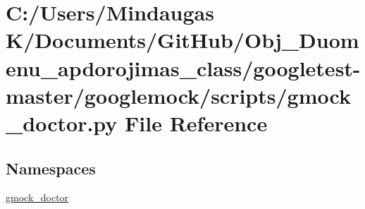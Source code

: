 \hypertarget{googletest-master_2googlemock_2scripts_2gmock__doctor_8py}{}\section{C\+:/\+Users/\+Mindaugas K/\+Documents/\+Git\+Hub/\+Obj\+\_\+\+Duomenu\+\_\+apdorojimas\+\_\+class/googletest-\/master/googlemock/scripts/gmock\+\_\+doctor.py File Reference}
\label{googletest-master_2googlemock_2scripts_2gmock__doctor_8py}
\subsection*{Namespaces}
\begin{DoxyCompactItemize}
\item 
 \mbox{\hyperlink{namespacegmock__doctor}{gmock\+\_\+doctor}}
\end{DoxyCompactItemize}
